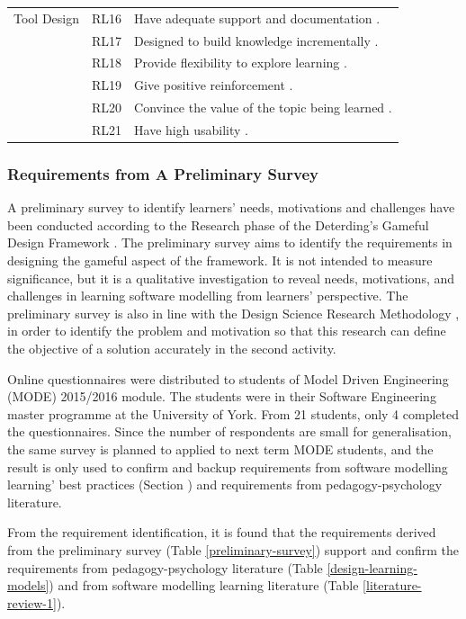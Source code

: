 \documentclass[12pt, a4paper]{report} \usepackage[titletoc]{appendix}
\begin{document}
\begin{table}[t!]
\begin{center}
\begin{tabular}{ p{1.6cm}p{1cm}p{10.4cm} }
\hline
\multirow{1}{2cm}{Tool Design}
& RL16 & Have adequate support and documentation \cite{liebel2015ready}. \\
& RL17 & Designed to build knowledge incrementally \cite{lethbridge2014teaching}.\\
& RL18 & Provide flexibility to explore learning \cite{lethbridge2014teaching}. \\
& RL19 & Give positive reinforcement \cite{lethbridge2014teaching}. \\
& RL20 & Convince the value of the topic being learned \cite{lethbridge2014teaching}. \\ 
& RL21 & Have high usability \cite{lethbridge2014teaching}.\\ 
\hline
\end{tabular}
\end{center}
\end{table}

\subsubsection{Requirements from A Preliminary Survey}
\label{Requirements from A Preliminary Survey}
A preliminary survey to identify learners' needs, motivations and challenges have been conducted according to the Research phase of the Deterding's Gameful Design Framework \cite{deterding2015lens}. The preliminary survey aims to identify the requirements in designing the gameful aspect of the framework. It is not intended to measure significance, but it is a qualitative investigation to reveal needs, motivations, and challenges in learning software modelling from learners' perspective. The preliminary survey is also in line with the Design Science Research Methodology \cite{peffers2007design}, in order to identify the problem and motivation so that this research can define the objective of a solution accurately in the second activity.

Online questionnaires were distributed to students of Model Driven Engineering (MODE) 2015/2016 module. The students were in their Software Engineering master programme at the University of York. From 21 students, only 4 completed the questionnaires. Since the number of respondents are small for generalisation, the same survey is planned to applied to next term MODE students, and the result is only used to confirm and backup requirements from software modelling learning' best practices (Section ) and requirements from pedagogy-psychology literature.

From the requirement identification, it is found that the requirements derived from the preliminary survey (Table \ref{preliminary-survey}) support and confirm the requirements from pedagogy-psychology literature (Table \ref{design-learning-models}) and from software modelling learning literature (Table \ref{literature-review-1}). 
\end{document}
